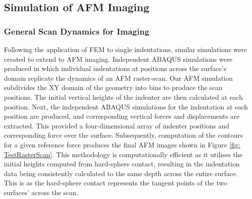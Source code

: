 \subsection{Simulation of AFM Imaging\label{Chapter 2: ABAQUS Simulation of AFM Raster Scan}}

\subsubsection{General Scan Dynamics for Imaging}

Following the application of FEM to single indentations, similar simulations were created to extend to AFM imaging. Independent ABAQUS simulations were produced in which individual indentations at positions across the surface's domain replicate the dynamics of an AFM raster-scan. Our AFM simulation subdivides the XY domain of the geometry into bins to produce the scan positions. The initial vertical heights of the indenter are then calculated at each position. Next, the independent ABAQUS simulations for the indentation at each position are produced, and corresponding vertical forces and displacements are extracted. This provided a four-dimensional array of indenter positions and corresponding force over the surface. Subsequently, computation of the contours for a given reference force produces the final AFM images shown in Figure \ref{fig: TestRasterScan}. This methodology is computationally efficient as it utilises the initial heights computed from hard-sphere contact, resulting in the indentation data being consistently calculated to the same depth across the entire surface. This is as the hard-sphere contact represents the tangent points of the two surfaces' across the scan.

